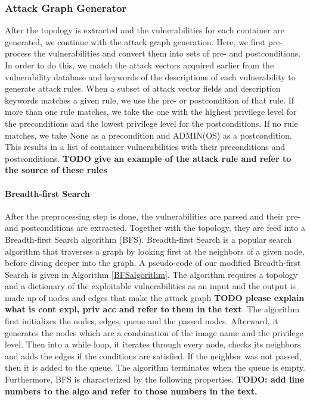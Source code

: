 \subsubsection{Attack Graph Generator}
\label{chap:attack_graph_p}

After the topology  is extracted and the vulnerabilities for each container are generated, we continue with the attack graph generation. Here, we first pre-process the vulnerabilities and convert them into sets of pre- and postconditions. In order to do this, we match the attack vectors acquired earlier from the vulnerability database and keywords of the descriptions of each vulnerability to generate attack rules. When a subset of attack vector fields and description keywords matches a given rule, we use the pre- or postcondition of that rule. If more than one rule matches, we take the one with the highest privilege level for the preconditions and the lowest privilege level for the postconditions. If no rule matches, we take None as a precondition and ADMIN(OS) as a postcondition. This results in a list of container vulnerabilities with their preconditions and postconditions. \textbf{TODO give an example of the attack rule and refer to the source of these rules}

\paragraph{Breadth-first Search}
\label{chap:bfs}

After the preprocessing step is done, the vulnerabilities are parsed and their pre- and postconditions are extracted. Together with the topology, they are feed into a Breadth-first Search algorithm (BFS).
Breadth-first Search is a popular search algorithm that traverses a graph by looking first at the neighbors of a given node, before diving deeper into the graph. A pseudo-code of our modified Breadth-first Search is given in Algorithm \ref{BFSalgorithm}. The algorithm requires a topology and a dictionary of the exploitable vulnerabilities as an input and the output is made up of nodes and edges that make the attack graph \textbf{TODO please explain what is cont expl, priv acc and refer to them in the text}. The algorithm first initializes the nodes, edges, queue and the passed nodes. Afterward, it generates the nodes which are a combination of the image name and the privilege level. Then into a while loop, it iterates through every node, checks its neighbors and adds the edges if the conditions are satisfied. If the neighbor was not passed, then it is added to the queue. The algorithm terminates when the queue is empty. Furthermore, BFS is characterized by the following properties.
\textbf{TODO: add line numbers to the algo and refer to those numbers in the text.}


